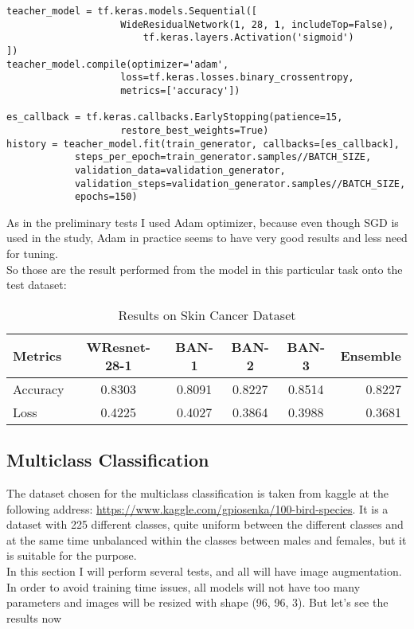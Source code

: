 \lstset{language=Python}
\lstset{frame=lines}
\lstset{basicstyle=\footnotesize}
\begin{lstlisting}
teacher_model = tf.keras.models.Sequential([
                 	WideResidualNetwork(1, 28, 1, includeTop=False),
                    	tf.keras.layers.Activation('sigmoid')
])
teacher_model.compile(optimizer='adam', 
					loss=tf.keras.losses.binary_crossentropy, 
					metrics=['accuracy'])

es_callback = tf.keras.callbacks.EarlyStopping(patience=15,
					restore_best_weights=True)
history = teacher_model.fit(train_generator, callbacks=[es_callback],
 			steps_per_epoch=train_generator.samples//BATCH_SIZE, 
 			validation_data=validation_generator, 
 			validation_steps=validation_generator.samples//BATCH_SIZE, 
 			epochs=150)
\end{lstlisting}
As in the preliminary tests I used Adam optimizer, because even though SGD is used in the study, Adam in practice seems to have very good results and less need for tuning.\\
So those are the result performed from the model in this particular task onto the test dataset:\\
\begin{table}[h!]
  \begin{center}
    \caption{Results on Skin Cancer Dataset}
    \begin{tabular}{l|c|c|c|c|r} 
      \textbf{Metrics} & \textbf{WResnet-28-1} & \textbf{BAN-1} & \textbf{BAN-2} & \textbf{BAN-3} & \textbf{Ensemble}\\ 
      \hline
      Accuracy & 0.8303 & 0.8091 & 0.8227 & 0.8514 & 0.8227\\
      Loss & 0.4225 & 0.4027 & 0.3864 & 0.3988 & 0.3681\\

    \end{tabular}
  \end{center}
\end{table}

\subsection{Multiclass Classification}
The dataset chosen for the multiclass classification is taken from kaggle at the following address: \url{https://www.kaggle.com/gpiosenka/100-bird-species}. It is a dataset with 225 different classes, quite uniform between the different classes and at the same time unbalanced within the classes between males and females, but it is suitable for the purpose.\\
In this section I will perform several tests, and all will have image augmentation.
In order to avoid training time issues, all models will not have too many parameters and images will be resized with shape (96, 96, 3). But let's see the results now
